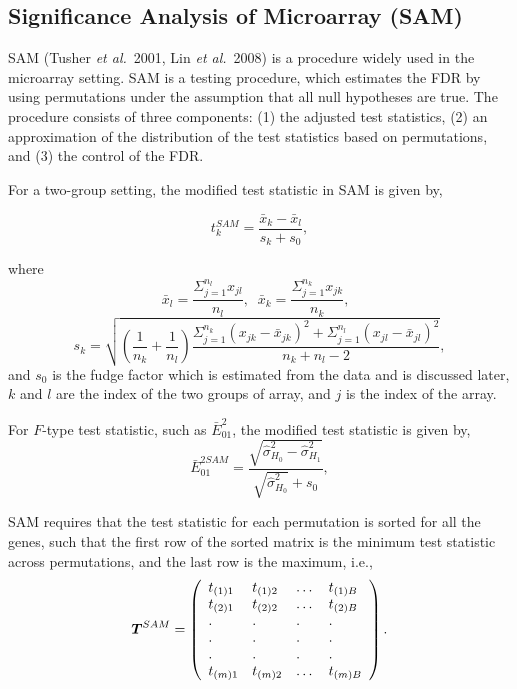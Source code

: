 \documentclass[10pt]{mybook4}
\newcommand{\T}{\mbox{\boldmath $T$}}
\begin{document}
\subsection{Significance Analysis of Microarray (SAM)}

SAM (Tusher \textit{et al.}\ 2001, Lin \textit{et al.}\ 2008) is a procedure widely used in the
microarray setting. SAM is a testing procedure, which estimates the
FDR by using permutations under the assumption that all null
hypotheses are true. The procedure consists of three components: (1)
the adjusted test statistics, (2) an approximation of the
distribution of the test statistics based on permutations, and (3)
the control of the FDR.

For a two-group setting, the modified test statistic in SAM is given
by,

\begin{equation}
t_{k}^{SAM}= \frac{\bar{x}_{k}-\bar{x}_{l}} {s_{k}+s_{0}},
\label{ttestSAM}
\end{equation}

where \[ \bar{x}_{l}=\frac{\Sigma_{j=1}^{n_{l}} x_{jl}}{n_{l}},\;\;
\bar{x}_{k}=\frac{\Sigma_{j=1}^{n_{k}} x_{jk}}{n_{k}},\;\;\]
\[s_{k}=\sqrt{\left (\frac{1}{n_{k}}+\frac{1}{n_{l}} \right )
{\frac{\Sigma_{j=1}^{n_{k}}
   (x_{jk}-\bar{x}_{jk})^2+\Sigma_{j=1}^{n_{l}}
   (x_{jl}-\bar{x}_{jl})^2}{n_{k}+n_{l}-2}}},
   \]
and $s_0$ is the fudge factor which is estimated from the data and
is discussed later, $k$ and $l$ are the index of the two groups of
array, and $j$ is the index of the array.

For $F$-type test statistic, such as $\bar{E}_{01}^2$, the modified test
statistic is given by,
\begin{equation}
\bar{E}_{01}^{2SAM}= \frac{\sqrt{\hat{\sigma}^2_{H_0}-\hat{\sigma}^2_{H_1}}} {\sqrt{\hat{\sigma}^2_{H_0}}+s_{0}},
\label{ttestSAM}
\end{equation}






SAM requires that the test statistic for each permutation is sorted
for all the genes, such that the first row of the sorted matrix is
the minimum test statistic across permutations, and the last row is
the maximum, i.e.,
\[\T^{SAM}= \left (
\begin{array}{llll}
t_{(1)1} & t_{(1)2} & \dots & t_{(1)B}\\
t_{(2)1} & t_{(2)2} & \dots & t_{(2)B}\\
.    & .    &.      & .     \\
.    & .    &.      & .     \\
.    & .    &.      & .     \\
t_{(m)1} & t_{(m)2} & \dots & t_{(m)B}\\
\end{array}
\right ).
\]
\end{document}
